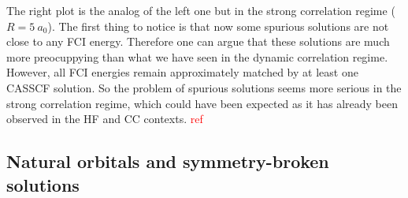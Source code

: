 \documentclass[aps,prb,reprint,showkeys,superscriptaddress]{revtex4-1}
\newcommand{\todo}[1]{\textcolor{red}{#1}}
\begin{document}
The right plot is the analog of the left one but in the strong correlation regime ($R=5~a_0$).
The first thing to notice is that now some spurious solutions are not close to any FCI energy.
Therefore one can argue that these solutions are much more preocuppying than what we have seen in the dynamic correlation regime.
However, all FCI energies remain approximately matched by at least one CASSCF solution.
So the problem of spurious solutions seems more serious in the strong correlation regime, which could have been expected as it has already been observed in the HF and CC contexts. \todo{ref}

\subsection{Natural orbitals and symmetry-broken solutions}
\label{sec:natural}
\end{document}
